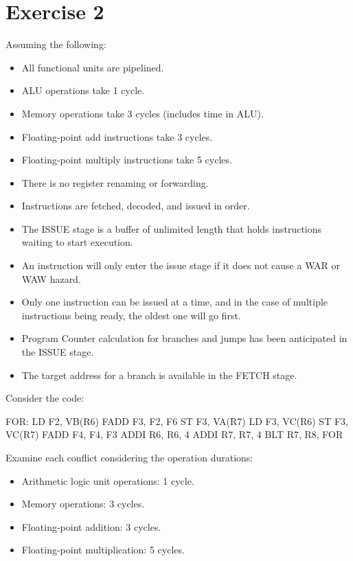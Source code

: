 \section{Exercise 2}

Assuming the following:
\begin{itemize}
    \item All functional units are pipelined.
    \item ALU operations take 1 cycle.
    \item Memory operations take 3 cycles (includes time in ALU).
    \item Floating-point add instructions take 3 cycles.
    \item Floating-point multiply instructions take 5 cycles.
    \item There is no register renaming or forwarding.
    \item Instructions are fetched, decoded, and issued in order.
    \item The ISSUE stage is a buffer of unlimited length that holds instructions waiting to start execution.
    \item An instruction will only enter the issue stage if it does not cause a WAR or WAW hazard.
    \item Only one instruction can be issued at a time, and in the case of multiple instructions being ready, the oldest one will go first.
    \item Program Counter calculation for branches and jumps has been anticipated in the ISSUE stage.
    \item The target address for a branch is available in the FETCH stage.
\end{itemize}
Consider the code:
\begin{verbnobox}[\verbarg]
FOR:    LD F2, VB(R6)
        FADD F3, F2, F6
        ST F3, VA(R7)
        LD F3, VC(R6)
        ST F3, VC(R7)
        FADD F4, F4, F3
        ADDI R6, R6, 4
        ADDI R7, R7, 4
        BLT R7, R8, FOR
\end{verbnobox}
Examine each conflict considering the operation durations:
\begin{itemize}
    \item Arithmetic logic unit operations: 1 cycle.
    \item Memory operations: 3 cycles.
    \item Floating-point addition: 3 cycles.
    \item Floating-point multiplication: 5 cycles.
\end{itemize}

